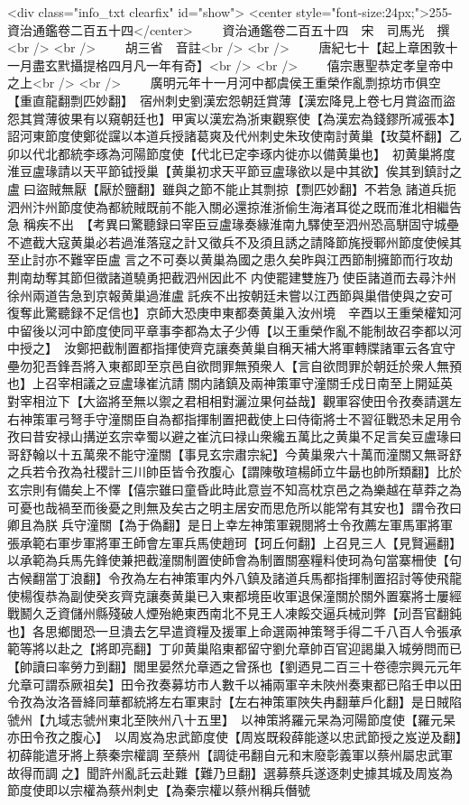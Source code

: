 <div class="info_txt clearfix" id="show">
<center style="font-size:24px;">255-資治通鑑卷二百五十四</center>
  　　資治通鑑卷二百五十四　宋　司馬光　撰<br />
<br />
　　胡三省　音註<br />
<br />
　　唐紀七十【起上章困敦十一月盡玄黓攝提格四月凡一年有奇】<br />
<br />
　　僖宗惠聖恭定孝皇帝中之上<br />
<br />
　　廣明元年十一月河中都虞侯王重榮作亂剽掠坊市俱空【重直龍翻剽匹妙翻】　宿州刺史劉漢宏怨朝廷賞薄【漢宏降見上卷七月賞盜而盜怨其賞薄彼果有以窺朝廷也】甲寅以漢宏為浙東觀察使【為漢宏為錢鏐所㓕張本】　詔河東節度使鄭從讜以本道兵授諸葛爽及代州刺史朱玫使南討黄巢【玫莫杯翻】乙卯以代北都統李琢為河陽節度使【代北已定李琢内徙亦以備黄巢也】　初黄巢將度淮豆盧瑑請以天平節钺授巢【黄巢初求天平節豆盧瑑欲以是中其欲】俟其到鎮討之盧曰盜賊無厭【厭於鹽翻】雖與之節不能止其剽掠【剽匹妙翻】不若急諸道兵扼泗州汴州節度使為都統賊既前不能入關必還掠淮浙偷生海渚耳從之既而淮北相繼告急稱疾不出　【考異曰驚聽録曰宰臣豆盧瑑奏緣淮南九驛使至泗州恐高駢固守城壘不遮截大寇黄巢必若過淮落寇之計又徵兵不及須且誘之請降節旄授鄆州節度使候其至止討亦不難宰臣盧言之不可奏以黄巢為國之患久矣昨與江西節制擁節而行攻劫荆南劫奪其節但徵諸道驍勇把截泗州因此不内使罷建雙旌乃使臣諸道而去尋汴州徐州兩道告急到京報黄巢過淮盧託疾不出按朝廷未嘗以江西節與巢借使與之安可復奪此驚聽録不足信也】京師大恐庚申東都奏黄巢入汝州境　辛酉以王重榮權知河中留後以河中節度使同平章事李都為太子少傅【以王重榮作亂不能制故召李都以河中授之】　汝鄭把截制置都指揮使齊克讓奏黄巢自稱天補大將軍轉牒諸軍云各宜守壘勿犯吾鋒吾將入東都即至京邑自欲問罪無預衆人【言自欲問罪於朝廷於衆人無預也】上召宰相議之豆盧瑑崔沆請關内諸鎮及兩神策軍守潼關壬戍日南至上開延英對宰相泣下【大盜將至無以禦之君相相對灑泣果何益哉】觀軍容使田令孜奏請選左右神策軍弓弩手守潼關臣自為都指揮制置把截使上曰侍衛將士不習征戰恐未足用令孜曰昔安禄山搆逆玄宗幸蜀以避之崔沆曰禄山衆纔五萬比之黄巢不足言矣豆盧瑑曰哥舒翰以十五萬衆不能守潼關【事見玄宗肅宗紀】今黄巢衆六十萬而潼關又無哥舒之兵若令孜為社稷計三川帥臣皆令孜腹心【謂陳敬瑄楊師立牛朂也帥所類翻】比於玄宗則有備矣上不懌【僖宗雖曰童昏此時此意豈不知高枕京邑之為樂越在草莽之為可憂也哉禍至而後憂之則無及矣古之明主居安而思危所以能常有其安也】謂令孜曰卿且為朕兵守潼關【為于偽翻】是日上幸左神策軍親閱將士令孜薦左軍馬軍將軍張承範右軍步軍將軍王師會左軍兵馬使趙珂【珂丘何翻】上召見三人【見賢遍翻】以承範為兵馬先鋒使兼把截潼關制置使師會為制置關塞糧料使珂為句當寨柵使【句古候翻當丁浪翻】令孜為左右神策軍内外八鎮及諸道兵馬都指揮制置招討等使飛龍使楊復恭為副使癸亥齊克讓奏黄巢已入東都境臣收軍退保潼關於關外置寨將士屢經戰鬭久乏資儲州縣殘破人煙殆絶東西南北不見王人凍餒交逼兵械刓弊【刓吾官翻鈍也】各思鄉閭恐一旦潰去乞早遣資糧及援軍上命選兩神策弩手得二千八百人令張承範等將以赴之【將即亮翻】丁卯黄巢陷東都留守劉允章帥百官迎謁巢入城勞問而已【帥讀曰率勞力到翻】閭里晏然允章迺之曾孫也【劉迺見二百三十卷德宗興元元年允章可謂忝厥祖矣】田令孜奏募坊市人數千以補兩軍辛未陜州奏東都已陷壬申以田令孜為汝洛晉絳同華都統將左右軍東討【左右神策軍陜失冉翻華戶化翻】是日賊陷虢州【九域志虢州東北至陜州八十五里】　以神策將羅元杲為河陽節度使【羅元杲亦田令孜之腹心】　以周岌為忠武節度使【周岌既殺薛能遂以忠武節授之岌逆及翻】初薛能遣牙將上蔡秦宗權調至蔡州【調徒弔翻自元和末廢彰義軍以蔡州屬忠武軍故得而調之】聞許州亂託云赴難【難乃旦翻】選募蔡兵遂逐刺史據其城及周岌為節度使即以宗權為蔡州刺史【為秦宗權以蔡州稱兵僭號